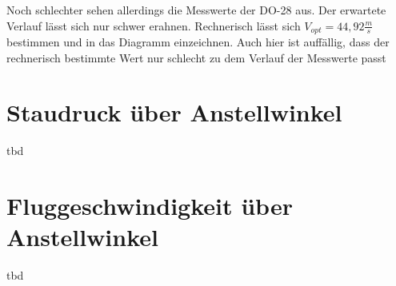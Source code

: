Noch schlechter sehen allerdings die Messwerte der DO-28 aus. Der erwartete Verlauf lässt sich nur schwer erahnen. Rechnerisch lässt sich $V_{opt} = 44,92 \frac{m}{s}$
bestimmen und in das Diagramm einzeichnen. Auch hier ist auffällig, dass der rechnerisch bestimmte Wert nur schlecht zu dem Verlauf der Messwerte passt
\section{Staudruck über Anstellwinkel}
tbd

\section{Fluggeschwindigkeit über Anstellwinkel}
tbd